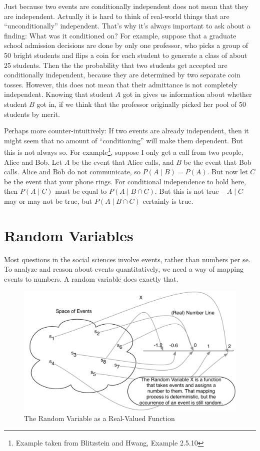 \documentclass[
  letterpaper,
]{book}
\theoremstyle{definition}
\theoremstyle{definition}
\theoremstyle{plain}
\theoremstyle{definition}
\theoremstyle{plain}
\theoremstyle{plain}
\theoremstyle{remark}
\begin{document}
Just because two events are conditionally independent does not mean that
they are independent. Actually it is hard to think of real-world things
that are ``unconditionally'' independent. That's why it's always
important to ask about a finding: What was it conditioned on? For
example, suppose that a graduate school admission decisions are done by
only one professor, who picks a group of 50 bright students and flips a
coin for each student to generate a class of about 25 students. Then the
the probability that two students get accepted are conditionally
independent, because they are determined by two separate coin tosses.
However, this does not mean that their admittance is not completely
independent. Knowing that student \(A\) got in gives us information
about whether student \(B\) got in, if we think that the professor
originally picked her pool of 50 students by merit.

Perhaps more counter-intuitively: If two events are already independent,
then it might seem that no amount of ``conditioning'' will make them
dependent. But this is not always so. For example\footnote{Example taken
  from Blitzstein and Hwang, Example 2.5.10}, suppose I only get a call
from two people, Alice and Bob. Let \(A\) be the event that Alice calls,
and \(B\) be the event that Bob calls. Alice and Bob do not communicate,
so \(P(A \mid B) = P(A).\) But now let \(C\) be the event that your
phone rings. For conditional independence to hold here, then
\(P(A \mid C)\) must be equal to \(P(A \mid B \cap C).\) But this is not
true -- \(A \mid C\) may or may not be true, but \(P(A \mid B \cap C)\)
certainly is true.

\hypertarget{random-variables}{%
\section{Random Variables}\label{random-variables}}

Most questions in the social sciences involve events, rather than
numbers per se. To analyze and reason about events quantitatively, we
need a way of mapping events to numbers. A random variable does exactly
that.

\begin{figure}

{\centering \includegraphics{./images/rv.pdf}

}

\caption{\label{fig-rv-image}The Random Variable as a Real-Valued
Function}

\end{figure}
\end{document}

